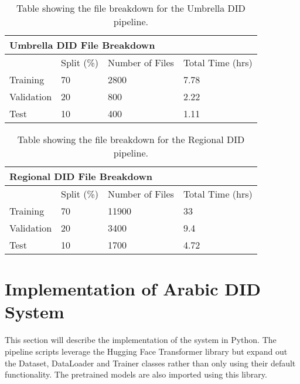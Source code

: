 \begin{table}[h!]
    \begin{tabular}{|llll|}
    \hline
    \multicolumn{4}{|l|}{Umbrella DID File Breakdown}                                                                            \\ \hline
    \multicolumn{1}{|l|}{}           & \multicolumn{1}{l|}{Split (\%)} & \multicolumn{1}{l|}{Number of Files} & Total Time (hrs) \\ \hline
    \multicolumn{1}{|l|}{Training}   & \multicolumn{1}{l|}{70}         & \multicolumn{1}{l|}{2800}            & 7.78             \\ \hline
    \multicolumn{1}{|l|}{Validation} & \multicolumn{1}{l|}{20}         & \multicolumn{1}{l|}{800}             & 2.22             \\ \hline
    \multicolumn{1}{|l|}{Test}       & \multicolumn{1}{l|}{10}         & \multicolumn{1}{l|}{400}             & 1.11             \\ \hline
    \end{tabular}
    \caption{Table showing the file breakdown for the Umbrella DID pipeline.}
    \label{tab:umbrsplit}
\end{table}

\begin{table}[h!]
    \begin{tabular}{|llll|}
    \hline
    \multicolumn{4}{|l|}{Regional DID File Breakdown}                                                                            \\ \hline
    \multicolumn{1}{|l|}{}           & \multicolumn{1}{l|}{Split (\%)} & \multicolumn{1}{l|}{Number of Files} & Total Time (hrs) \\ \hline
    \multicolumn{1}{|l|}{Training}   & \multicolumn{1}{l|}{70}         & \multicolumn{1}{l|}{11900}           & 33               \\ \hline
    \multicolumn{1}{|l|}{Validation} & \multicolumn{1}{l|}{20}         & \multicolumn{1}{l|}{3400}            & 9.4              \\ \hline
    \multicolumn{1}{|l|}{Test}       & \multicolumn{1}{l|}{10}         & \multicolumn{1}{l|}{1700}            & 4.72             \\ \hline
    \end{tabular}
    \caption{Table showing the file breakdown for the Regional DID pipeline.}
    \label{tab:regsplit}
\end{table}
\pagebreak
\section{Implementation of Arabic DID System}\label{sect:impDID}
This section will describe the implementation of the system in Python. The pipeline scripts leverage 
the Hugging Face Transformer library but expand out the Dataset, DataLoader and Trainer classes rather than only using 
their default functionality. The pretrained models are also imported using this library. 

